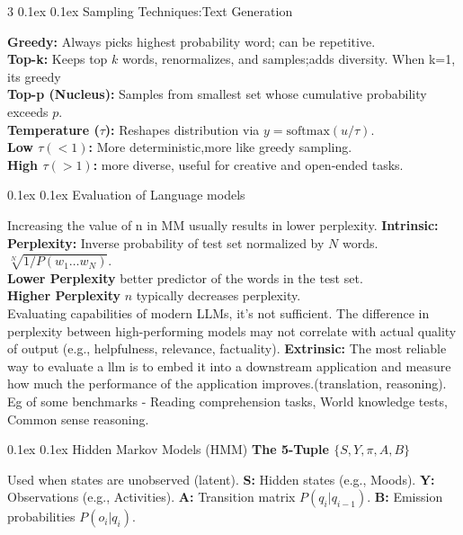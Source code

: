 \documentclass[8pt,landscape]{article}
\makeatletter
\renewcommand{\section}{\@startsection{section}{2}{0pt}%
{0.1ex}%
{0.1ex}%
{\fontsize{8}{9}\bfseries\color{red}}}
\newcommand{\smalltext}[1]{
{\fontsize{8}{9}\selectfont\sloppy #1\par}
}
\makeatother
\begin{document}
\begin{multicols}{3}
\section{Sampling Techniques:Text Generation}
\smalltext{
\textbf{Greedy:} Always picks highest probability word; can be repetitive. \\
\textbf{Top-k:} Keeps top $k$ words, renormalizes, and samples;adds diversity. When k=1, its greedy \\
\textbf{Top-p (Nucleus):} Samples from smallest set whose cumulative probability exceeds $p$. \\
\textbf{Temperature ($\tau$):} Reshapes distribution via $y = \text{softmax}(u/\tau)$. \\
\textbf{Low $\tau (<1)$:} More deterministic,more like greedy sampling. \\
\textbf{High $\tau (>1)$:} more diverse, useful for creative and open-ended tasks.
}

\section{Evaluation of Language models}
\smalltext{
Increasing the value of n in MM usually results in lower perplexity. 
\textbf{Intrinsic: Perplexity:} Inverse probability of test set normalized by $N$ words. $\sqrt[N]{1 / P(w_1 \dots w_N)}$. \\
\textbf{Lower Perplexity} better predictor of the words in the test set. \\
\textbf{Higher Perplexity} $n$ typically decreases perplexity. \\
Evaluating capabilities of modern LLMs, it’s not sufficient. The difference in perplexity between high-performing models may not correlate with actual quality of output (e.g., helpfulness, relevance, factuality).
\textbf{Extrinsic:} The most reliable way to evaluate a llm is to embed it into a downstream application and measure how much the performance of the application improves.(translation, reasoning). Eg of some benchmarks - Reading comprehension tasks, World knowledge tests, Common sense reasoning.
}

\section{Hidden Markov Models (HMM)}
\textbf{The 5-Tuple $\{S, Y, \pi, A, B\}$}
\smalltext{
Used when states are unobserved (latent).
\textbf{S:} Hidden states (e.g., Moods).
\textbf{Y:} Observations (e.g., Activities).
\textbf{A:} Transition matrix $P(q_i | q_{i-1})$.
\textbf{B:} Emission probabilities $P(o_i | q_i)$.
}


\end{multicols}
\end{document}

